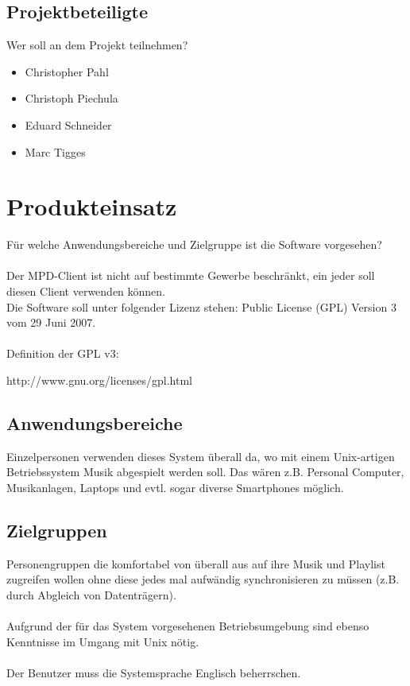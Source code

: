 \subsection{Projektbeteiligte}
Wer soll an dem Projekt teilnehmen?
\begin{itemize}
	\item Christopher Pahl
	\item Christoph Piechula
	\item Eduard Schneider
	\item Marc Tigges
\end{itemize}
\section{Produkteinsatz}
Für welche Anwendungsbereiche und Zielgruppe ist die Software vorgesehen?\ \\ \\
Der MPD-Client ist nicht auf bestimmte Gewerbe beschränkt, ein jeder soll diesen
Client verwenden können. 
\\
Die Software soll unter folgender Lizenz stehen:
Public License (GPL) Version 3 vom 29 Juni 2007.\ \\ \\
Definition der GPL v3:
\begin{center}
	http://www.gnu.org/licenses/gpl.html
\end{center}

\subsection{Anwendungsbereiche}
Einzelpersonen verwenden dieses System überall da, wo mit
einem Unix-artigen Betriebssystem Musik abgespielt werden soll.
Das wären z.B. Personal Computer, Musikanlagen, Laptops und evtl.
sogar diverse Smartphones möglich.

\subsection{Zielgruppen}
Personengruppen die komfortabel von überall aus auf ihre Musik und Playlist zugreifen
wollen ohne diese jedes mal aufwändig synchronisieren zu müssen (z.B. durch Abgleich von Datenträgern).\ \\ \\
Aufgrund der für das System vorgesehenen Betriebsumgebung sind ebenso Kenntnisse im Umgang mit Unix nötig.\ \\ \\
Der Benutzer muss die Systemsprache Englisch beherrschen.

